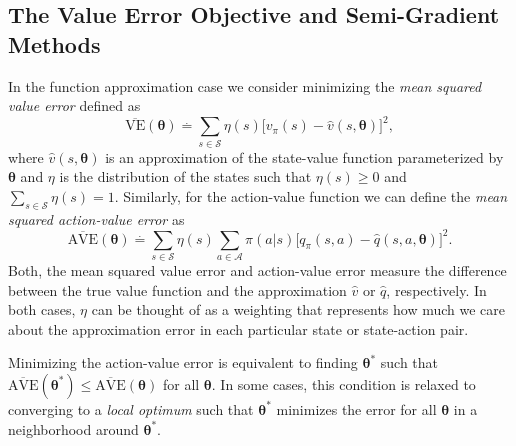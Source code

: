 \subsection{The Value Error Objective and Semi-Gradient Methods}

In the function approximation case we consider minimizing the \textit{mean squared value error} defined as
%
\begin{equation}
\label{eq:value_error}
\overline{\text{VE}}(\boldsymbol{\theta}) \overset{.}{=} 
	\sum_{s \in \mathcal{S}} \eta(s) \big[ v_\pi(s) - \hat{v}(s, \boldsymbol{\theta}) \big]^2,
\end{equation}
%
where $\hat{v}(s,\boldsymbol{\theta})$ is an approximation of the state-value function parameterized by $\boldsymbol{\theta}$ and $\eta$ is the distribution of the states such that $\eta(s) \geq 0$ and $\sum_{s \in \mathcal{S}} \eta(s) = 1$.
Similarly, for the action-value function we can define the \textit{mean squared action-value error} as
%
\begin{equation}
\label{eq:av_error}
\overline{\text{AVE}}(\boldsymbol{\theta}) \overset{.}{=}
	\sum_{s \in \mathcal{S}} \eta(s) \sum_{a \in \mathcal{A}} \pi(a|s) \big[ q_\pi(s,a) 
    - \hat{q}(s,a, \boldsymbol{\theta}) \big]^2.
\end{equation}
%
Both, the mean squared value error and action-value error measure the difference between the true value function and the approximation $\hat{v}$ or $\hat{q}$, respectively. 
In both cases, $\eta$ can be thought of as a weighting that represents how much we care about the approximation error in each particular state or state-action pair.

Minimizing the action-value error is equivalent to finding $\boldsymbol{\theta}^*$ such that $\overline{\text{AVE}}(\boldsymbol\theta^*) \leq \overline{\text{AVE}}(\boldsymbol\theta)$ for all $\boldsymbol\theta$.
In some cases, this condition is relaxed to converging to a \textit{local optimum} such that $\boldsymbol\theta^*$ minimizes the error for all $\boldsymbol\theta$ in a neighborhood around $\boldsymbol\theta^*$.

